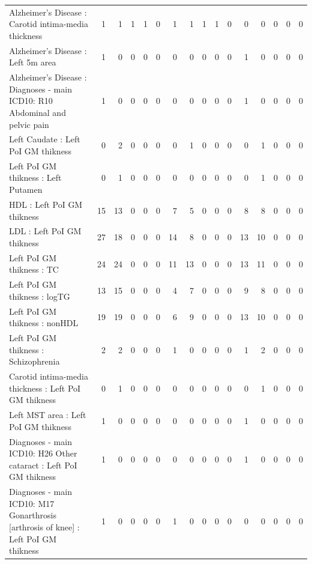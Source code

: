 \begin{table}[ht]
\begin{tabular}{lrrrrrrrrrrrrrrr}
  Alzheimer's Disease : Carotid intima-media thickness &   1 &   1 &   1 &   1 &   0 &   1 &   1 &   1 &   1 &   0 &   0 &   0 &   0 &   0 &   0 \\ 
  Alzheimer's Disease : Left 5m area &   1 &   0 &   0 &   0 &   0 &   0 &   0 &   0 &   0 &   0 &   1 &   0 &   0 &   0 &   0 \\ 
  Alzheimer's Disease : Diagnoses - main ICD10: R10 Abdominal and pelvic pain &   1 &   0 &   0 &   0 &   0 &   0 &   0 &   0 &   0 &   0 &   1 &   0 &   0 &   0 &   0 \\ 
  Left Caudate : Left PoI GM thikness &   0 &   2 &   0 &   0 &   0 &   0 &   1 &   0 &   0 &   0 &   0 &   1 &   0 &   0 &   0 \\ 
  Left PoI GM thikness : Left Putamen &   0 &   1 &   0 &   0 &   0 &   0 &   0 &   0 &   0 &   0 &   0 &   1 &   0 &   0 &   0 \\ 
  HDL : Left PoI GM thikness &  15 &  13 &   0 &   0 &   0 &   7 &   5 &   0 &   0 &   0 &   8 &   8 &   0 &   0 &   0 \\ 
  LDL : Left PoI GM thikness &  27 &  18 &   0 &   0 &   0 &  14 &   8 &   0 &   0 &   0 &  13 &  10 &   0 &   0 &   0 \\ 
  Left PoI GM thikness : TC &  24 &  24 &   0 &   0 &   0 &  11 &  13 &   0 &   0 &   0 &  13 &  11 &   0 &   0 &   0 \\ 
  Left PoI GM thikness : logTG &  13 &  15 &   0 &   0 &   0 &   4 &   7 &   0 &   0 &   0 &   9 &   8 &   0 &   0 &   0 \\ 
  Left PoI GM thikness : nonHDL &  19 &  19 &   0 &   0 &   0 &   6 &   9 &   0 &   0 &   0 &  13 &  10 &   0 &   0 &   0 \\ 
  Left PoI GM thikness : Schizophrenia &   2 &   2 &   0 &   0 &   0 &   1 &   0 &   0 &   0 &   0 &   1 &   2 &   0 &   0 &   0 \\ 
  Carotid intima-media thickness : Left PoI GM thikness &   0 &   1 &   0 &   0 &   0 &   0 &   0 &   0 &   0 &   0 &   0 &   1 &   0 &   0 &   0 \\ 
  Left MST area : Left PoI GM thikness &   1 &   0 &   0 &   0 &   0 &   0 &   0 &   0 &   0 &   0 &   1 &   0 &   0 &   0 &   0 \\ 
  Diagnoses - main ICD10: H26 Other cataract : Left PoI GM thikness &   1 &   0 &   0 &   0 &   0 &   0 &   0 &   0 &   0 &   0 &   1 &   0 &   0 &   0 &   0 \\ 
  Diagnoses - main ICD10: M17 Gonarthrosis [arthrosis of knee] : Left PoI GM thikness &   1 &   0 &   0 &   0 &   0 &   1 &   0 &   0 &   0 &   0 &   0 &   0 &   0 &   0 &   0 \\ 

\end{tabular}
\end{table}
